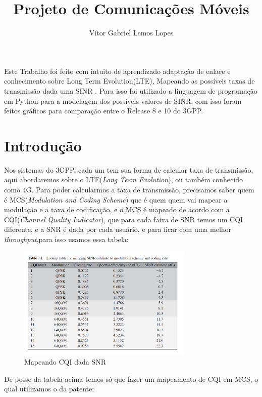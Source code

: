 \documentclass[12pt]{article}
\title{Projeto de Comunicações Móveis}
\author{Vítor Gabriel Lemos Lopes}
\begin{document}
 

\maketitle

     
\begin{resumo} 
  Este Trabalho foi feito com intuito de aprendizado adaptação de enlace e conhecimento sobre Long Term Evolution(LTE), Mapeando as possíveis taxas de transmissão dada uma SINR . Para isso foi utilizado a linguagem de programação em Python para a modelagem dos possíveis valores de SINR, com isso foram feitos gráficos para comparação entre o Release 8 e 10 do 3GPP.
\end{resumo}
\section{Introdução}
Nos sistemas do 3GPP, cada um tem sua forma de calcular taxa de transmissão, aqui abordaremos sobre o LTE(\textit{Long Term Evolution}), ou também conhecido como 4G. Para poder calcularmos a taxa de transmissão, precisamos saber quem é MCS(\textit{Modulation and Coding Scheme}) que é quem quem vai mapear a modulação e a taxa de codificação, e o MCS é mapeado de acordo com a CQI(\textit{Channel Quality Indicator}), que para cada faixa de SNR temos um CQI diferente, e a SNR é dada por cada usuário, e para ficar com uma melhor \textit{throughput},para isso usamos essa tabela:\cite{CQISNR}
\begin{figure}[h]
    \centering
    \includegraphics[width=0.75\textwidth]{SINRestimateLTEBook.png}
    \caption{Mapeando CQI dada SNR}
    \label{fig:my_label}
\end{figure}
\FloatBarrier
De posse da tabela acima temos só que fazer um mapeamento de CQI em MCS, o qual utilizamos o da patente: \cite{Patente}
\end{document}
